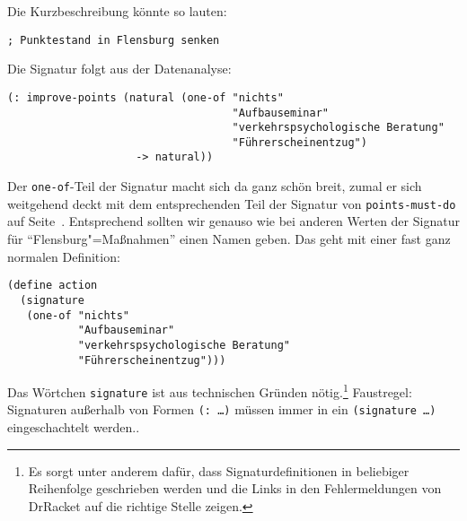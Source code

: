 Die Kurzbeschreibung könnte so lauten:
%
\begin{verbatim}
; Punktestand in Flensburg senken
\end{verbatim}
%
Die Signatur folgt aus der Datenanalyse:
%
\begin{verbatim}
(: improve-points (natural (one-of "nichts"
                                   "Aufbauseminar"
                                   "verkehrspsychologische Beratung"
                                   "Führerscheinentzug")
                    -> natural))
\end{verbatim}
%
Der \texttt{one-of}-Teil der Signatur macht sich da ganz schön breit,
zumal er sich weitgehend deckt mit dem entsprechenden Teil der
Signatur von \texttt{points-must-do} auf
Seite~\pageref{page:points-must-do}.  Entsprechend sollten wir genauso
wie bei anderen Werten der Signatur für "`Flensburg"=Maßnahmen"' einen
Namen geben.  Das geht mit einer fast ganz normalen Definition:
%
\begin{verbatim}
(define action
  (signature
   (one-of "nichts"
           "Aufbauseminar"
           "verkehrspsychologische Beratung"
           "Führerscheinentzug")))
\end{verbatim}
%
Das Wörtchen \texttt{signature}\label{page:signature} ist aus technischen Gründen
nötig.\footnote{Es sorgt unter anderem dafür, dass Signaturdefinitionen
  in beliebiger Reihenfolge geschrieben werden und die Links in den
  Fehlermeldungen von DrRacket auf die richtige Stelle zeigen.}
Faustregel: Signaturen außerhalb von Formen \texttt{(: \ldots)} müssen immer in ein \texttt{(signature
  \ldots)} eingeschachtelt werden..

